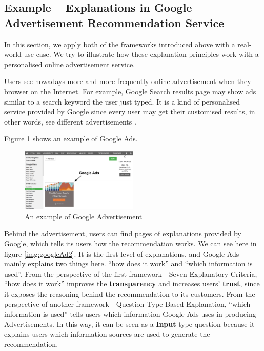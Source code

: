     \subsection{Example -- Explanations in Google Advertisement Recommendation Service}
        \indent In this section, we apply both of the frameworks introduced above with a real-world use case.  We try to illustrate how these explanation principles work with a personalised online advertisement service.

        \indent Users see nowadays more and more frequently online advertisement when they browser on the Internet. For example, Google Search results page may show ads similar to a search keyword the user just typed. It is a kind of personalised service provided by Google since every user may get their customised results, in other words, see different advertisements \cite{googleAdSetting}. 
        
        Figure \ref{img:googleAd1} shows an example of Google Ads.
        \begin{figure}[H]
            \centering
            \captionsetup{justification=centering}
            \includegraphics[width=0.5\textwidth]{img/googleAd1}
            \caption{An example of Google Advertisement\cite{googleAd1}}
            \label{img:googleAd1}
        \end{figure}

        \indent
        Behind the advertisement, users can find pages of explanations provided by Google, which tells its users how the recommendation works.
        We can see here in figure \ref{img:googleAd2}. It is the first level of explanations, and Google Ads mainly explains two things here. ``how does it work'' and ``which information is used''.  From the perspective of the first framework - Seven Explanatory Criteria, ``how does it work'' improves the \textbf{transparency}  and increases users' \textbf{trust}, since it exposes the reasoning behind the recommendation to its customers. From the perspective of another framework - Question Type Based Explanation, ``which information is used'' tells users which information Google Ads uses in producing Advertisements. In this way, it can be seen as a \textbf{Input} type question because it explains users which information sources are used to generate the recommendation.
        
